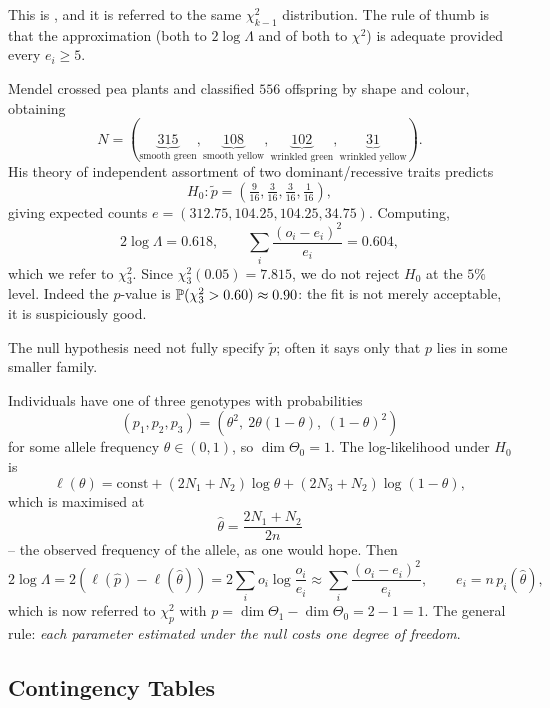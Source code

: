\documentclass[a4paper]{scrartcl}
\begin{document}
This is , and it is referred to the same $\chi^2_{k-1}$ distribution. The rule of thumb is that the approximation (both to $2\log\Lambda$ and of both to $\chi^2$) is adequate provided every $e_i \geq 5$.

\begin{example}
  Mendel crossed pea plants and classified $556$ offspring by shape and colour, obtaining
  $$
  N = (\underbrace{315}_{\text{smooth green}}, \underbrace{108}_{\text{smooth yellow}}, \underbrace{102}_{\text{wrinkled green}}, \underbrace{31}_{\text{wrinkled yellow}}).
  $$
  His theory of independent assortment of two dominant/recessive traits predicts
  $$
  H_0 : \tilde p = \left(\tfrac{9}{16}, \tfrac{3}{16}, \tfrac{3}{16}, \tfrac{1}{16}\right),
  $$
  giving expected counts $e = (312.75, 104.25, 104.25, 34.75)$. Computing,
  $$
  2\log\Lambda = 0.618, \qquad \sum_i\frac{(o_i-e_i)^2}{e_i} = 0.604,
  $$
  which we refer to $\chi^2_3$. Since $\chi^2_3(0.05) = 7.815$, we do not reject $H_0$ at the $5\%$ level. Indeed the $p$-value is $\mathbb{P}(\chi^2_3 > 0.60) \approx 0.90$: the fit is not merely acceptable, it is suspiciously good.
\end{example}

The null hypothesis need not fully specify $\tilde p$; often it says only that $p$ lies in some smaller family.

\begin{example}
  Individuals have one of three genotypes with probabilities
  $$
  \left(p_1,p_2,p_3\right) = \left(\theta^2,\ 2\theta(1-\theta),\ (1-\theta)^2\right)
  $$
  for some allele frequency $\theta \in (0,1)$, so $\dim\Theta_0 = 1$. The log-likelihood under $H_0$ is
  $$
  \ell(\theta) = \text{const} + (2N_1 + N_2)\log\theta + (2N_3+N_2)\log(1-\theta),
  $$
  which is maximised at
  $$
  \hat\theta = \frac{2N_1+N_2}{2n}
  $$
  -- the observed frequency of the allele, as one would hope. Then
  $$
  2\log\Lambda = 2\left(\ell(\hat p) - \ell(\hat\theta)\right) = 2\sum_i o_i \log\frac{o_i}{e_i} \approx \sum_i \frac{(o_i-e_i)^2}{e_i}, \qquad e_i = n\,p_i(\hat\theta),
  $$
  which is now referred to $\chi^2_p$ with $p = \dim\Theta_1 - \dim\Theta_0 = 2 - 1 = 1$. The general rule: \emph{each parameter estimated under the null costs one degree of freedom}.
\end{example}

\subsection{Contingency Tables}
\end{document}
